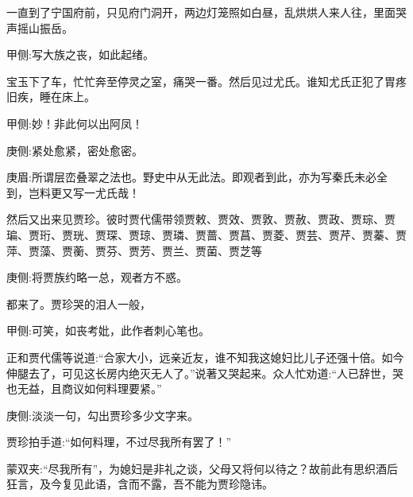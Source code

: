 \begin{parag}
    一直到了宁国府前，只见府门洞开，两边灯笼照如白昼，乱烘烘人来人往，里面哭声摇山振岳。\begin{note}甲侧:写大族之丧，如此起绪。\end{note}宝玉下了车，忙忙奔至停灵之室，痛哭一番。然后见过尤氏。谁知尤氏正犯了胃疼旧疾，睡在床上。\begin{note}甲侧:妙！非此何以出阿凤！\end{note}\begin{note}庚侧:紧处愈紧，密处愈密。\end{note}\begin{note}庚眉:所谓层峦叠翠之法也。野史中从无此法。即观者到此，亦为写秦氏未必全到，岂料更又写一尤氏哉！\end{note}然后又出来见贾珍。彼时贾代儒带领贾敕、贾效、贾敦、贾赦、贾政、贾琮、贾㻞、贾珩、贾珖、贾琛、贾琼、贾璘、贾蔷、贾菖、贾菱、贾芸、贾芹、贾蓁、贾萍、贾藻、贾蘅、贾芬、贾芳、贾兰、贾菌、贾芝等\begin{note}庚侧:将贾族约略一总，观者方不惑。\end{note}都来了。贾珍哭的泪人一般，\begin{note}甲侧:可笑，如丧考妣，此作者刺心笔也。\end{note}正和贾代儒等说道:“合家大小，远亲近友，谁不知我这媳妇比儿子还强十倍。如今伸腿去了，可见这长房内绝灭无人了。”说著又哭起来。众人忙劝道:“人已辞世，哭也无益，且商议如何料理要紧。”\begin{note}庚侧:淡淡一句，勾出贾珍多少文字来。\end{note}贾珍拍手道:“如何料理，不过尽我所有罢了！”\begin{note}蒙双夹:“尽我所有”，为媳妇是非礼之谈，父母又将何以待之？故前此有思织酒后狂言，及今复见此语，含而不露，吾不能为贾珍隐讳。\end{note}
\end{parag}


